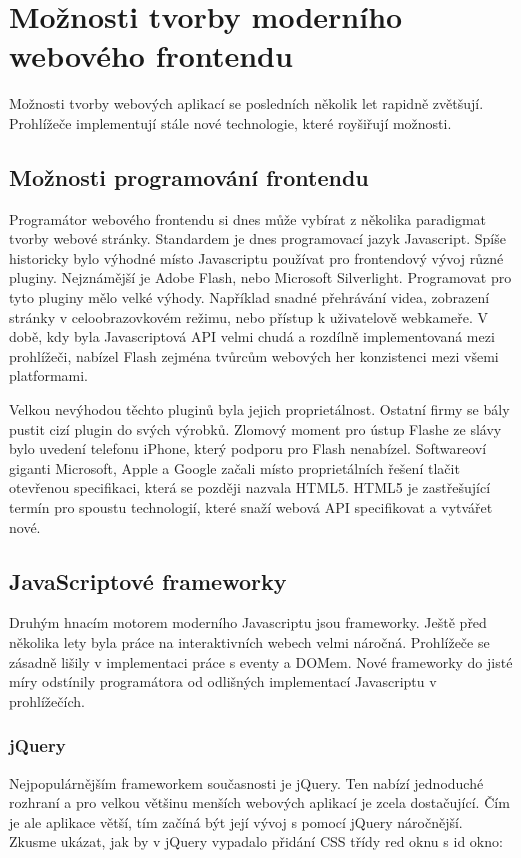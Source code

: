 \chapter{Možnosti tvorby moderního webového frontendu}

Možnosti tvorby webových aplikací se posledních několik let rapidně zvětšují. Prohlížeče implementují stále nové technologie, které royšiřují možnosti.

\section{Možnosti programování frontendu}

Programátor webového frontendu si dnes může vybírat z několika paradigmat tvorby webové stránky. Standardem je dnes programovací jazyk Javascript. Spíše historicky bylo výhodné místo Javascriptu používat pro frontendový vývoj různé pluginy. Nejznámější je Adobe Flash, nebo Microsoft Silverlight. Programovat pro tyto pluginy mělo velké výhody. Například snadné přehrávání videa, zobrazení stránky v celoobrazovkovém režimu, nebo přístup k uživatelově webkameře. V době, kdy byla Javascriptová API velmi chudá a rozdílně implementovaná mezi prohlížeči, nabízel Flash zejména tvůrcům webových her konzistenci mezi všemi platformami.

Velkou nevýhodou těchto pluginů byla jejich proprietálnost. Ostatní firmy se bály pustit cizí plugin do svých výrobků. Zlomový moment pro ústup Flashe ze slávy bylo uvedení telefonu iPhone, který podporu pro Flash nenabízel. Softwareoví giganti Microsoft, Apple a Google začali místo proprietálních řešení tlačit otevřenou specifikaci, která se později nazvala HTML5. HTML5 je zastřešující termín pro spoustu technologií, které snaží webová API specifikovat a vytvářet nové.

\section{JavaScriptové frameworky}

Druhým hnacím motorem moderního Javascriptu jsou frameworky. Ještě před několika lety byla práce na interaktivních webech velmi náročná. Prohlížeče se zásadně lišily v implementaci práce s eventy a DOMem. Nové frameworky do jisté míry odstínily programátora od odlišných implementací Javascriptu v prohlížečích.

\subsection{jQuery}
Nejpopulárnějším frameworkem současnosti je jQuery. Ten nabízí jednoduché rozhraní a pro velkou většinu menších webových aplikací je zcela dostačující. Čím je ale aplikace větší, tím začíná být její vývoj s pomocí jQuery náročnější. Zkusme ukázat, jak by v jQuery vypadalo přidání CSS třídy red oknu s id okno:


